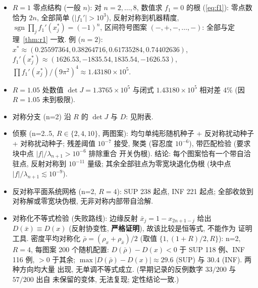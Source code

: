 \documentclass[UTF8]{ctexart}
\newcommand{\STRICT}{\textbf{严格证明}}
\begin{document}
\begin{itemize}
	\item $R=1$ 零点结构 (一般 $n$): 对 $n=2,\dots,8$, 数值求 $f_1=0$ 的根
	(\eqref{eq:f1}):
	零点数恰为 $2n$, 全部简单 ($|f_1'|>10^3$), 反射对称到机器精度,
	$\operatorname{sgn}\prod_jf_1'(x_j^*)=(-1)^n$, 区间符号图案
	$(-,+,-,\dots,-)$: 全部与定理~\ref{thm:r1} 一致. 例 ($n=2$):
	$x^*\approx(0.25597364,0.38264716,0.61735284,0.74402636)$,
	$f_1'(x_j^*)\approx(1626.53,-1835.54,1835.54,-1626.53)$,
	$\prod f_1'(x_j^*)/(9\pi^2)^4\approx1.43180\times10^5$.
	\item $R=1.05$ 处数值 $\det J=1.3765\times10^5$ 与闭式
	$1.43180\times10^5$ 相对差 $4\%$ (因 $R=1.05$ 未到极限).
	\item 对称分支 (n=2) 沿 $R$ 的 $\det J$ 与 $D$: 见附表.
	\item 侦察 (n=2..5, $R\in\{2,4,10\}$, 两图案): 均匀单纯形随机种子 +
	反对称扰动种子 + 对称扰动种子; 残差阈值 $10^{-7}$ 接受, 聚类 (容忍度
	$10^{-6}$), 带匹配检验 (要求块中点 $|f|/\lambda_{n+1}>10^{-6}$ 排除重合
	开关伪根). 结论: 每个图案恰有一个带自洽驻点, 反射对称到 $10^{-11}$ 量级;
	其余全部驻点为零宽块退化伪根 (块中点 $|f|/\lambda_{n+1}\lesssim10^{-9}$).
	\item 反对称平面系统网格 (n=2, $R=4$): SUP 238 起点, INF 221 起点;
	全部收敛到对称解或零宽块伪根, 无非对称内部带自洽解.
	\item 对称化不等式检验 (失败路线): 边缘反射 $\bar x_j=1-x_{2n+1-j}$ 给出
	$D(\bar x)\equiv D(x)$ (反射协变性, \STRICT), 故该比较是恒等式, 不能作为
	证明工具. 密度平均对称化 $\bar\rho=(\rho_x+\rho_{\bar x})/2$ (取值
	$\{1,(1+R)/2,R\}$): n=2, $R=4$, 每图案 200 个随机配置:
	$D(\bar\rho)-D(x)<0$ 于 SUP 118 例、INF 116 例, $>0$ 于其余;
	$\max|D(\bar\rho)-D(x)|\approx29.6$ (SUP) 与 $30.4$ (INF). 两种方向均大量
	出现, 无单调不等式成立. (早期记录的反例数字 $33/200$ 与 $57/200$ 出自
	未保留的变体, 无法复现; 定性结论一致.)
\end{itemize}
\end{document}
